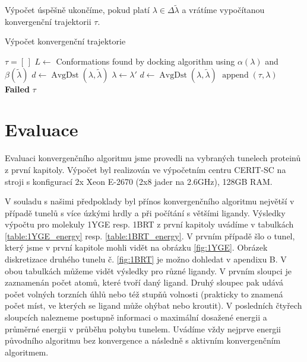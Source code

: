 Výpočet úspěšně ukončíme, pokud platí $\lambda \in \Delta\tilde{\lambda}$ a
vrátíme vypočítanou konvergenční trajektorii $ \tau $.

\begin{algorithm}[ht]
\caption{Výpočet konvergenční trajektorie}
\label{alg:convergence}
\begin{algorithmic}[1]

    \State $ \tau = [\,] $
    \While {$\lambda \not\in \Delta\tilde{\lambda}$}
        \State $ L \gets $ Conformations found by docking algorithm using $ \alpha(\lambda) $
            and $ \beta(\tilde{\lambda})$ \label{alg:convergence:docking}
        \State $ d \gets \operatorname{AvgDst}(\lambda, \tilde{\lambda}) $
             \label{alg:convergence:feasibility}
                 \label{alg:convergence:best}
                    \State $ \lambda \gets \lambda' $
                \EndIf
            \EndIf
        \EndFor
         \label{alg:convergence:progress}
            \State $d \gets \operatorname{AvgDst}(\lambda, \tilde{\lambda}) $
            \State $ \operatorname{append}(\tau, \lambda) $
        \Else
            \State \Return \textbf{Failed}
        \EndIf
    \EndWhile
    \State \Return $\tau$
\EndFunction


\end{algorithmic}
\end{algorithm}




\clearpage
\section{Evaluace} \label{subsec:convergence_evaluation}
Evaluaci konvergenčního algoritmu jsme provedli na vybraných tunelech proteinů
z první kapitoly. Výpočet byl realizován ve výpočetním centru CERIT-SC na
stroji s konfigurací 2x Xeon E-2670 (2x8 jader na 2.6GHz), 128GB RAM.

V souladu s našimi předpoklady byl přínos konvergenčního algoritmu největší
v případě tunelů s více úzkými hrdly a při počítání s většími ligandy. Výsledky
výpočtu pro molekuly 1YGE resp. 1BRT z první kapitoly uvádíme v tabulkách
\ref{table:1YGE_energy} resp. \ref{table:1BRT_energy}. V prvním případě šlo
o tunel, který jsme v první kapitole mohli vidět na obrázku \ref{fig:1YGE}.
Obrázek diskretizace druhého tunelu č. \ref{fig:1BRT} je možno dohledat v apendixu B.
V obou tabulkách můžeme vidět výsledky pro různé ligandy. V prvním sloupci
je zaznamenán počet atomů, které tvoří daný ligand. Druhý sloupec pak udává
počet volných torzních úhlů nebo též stupňů volnosti (prakticky to znamená počet míst, ve kterých
se ligand může ohýbat nebo kroutit). V posledních čtyřech sloupcích nalezneme
postupně informaci o maximální dosažené energii a průměrné energii v průběhu
pohybu tunelem. Uvádíme vždy nejprve energii původního algoritmu bez konvergence
a následně s aktivním konvergenčním algoritmem.

